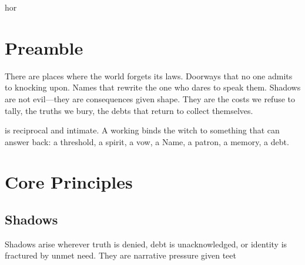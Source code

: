 hor{}




\section{Preamble}
There are places where the world forgets its laws.
Doorways that no one admits to knocking upon.
Names that rewrite the one who dares to speak them.
Shadows are not evil---they are consequences given shape. They are the costs we refuse to tally, the truths we bury, the debts that return to collect themselves.

\begin{RuleBox}
 is reciprocal and intimate. A working binds the witch to something that can answer back: a threshold, a spirit, a vow, a Name, a patron, a memory, a debt.
\end{RuleBox}

\section{Core Principles}
\subsection{Shadows}
Shadows arise wherever truth is denied, debt is unacknowledged, or identity is fractured by unmet need. They are narrative pressure given teet\documentclass[11pt,letterpaper]{article}
\usepackage[margin=0.85in]{geometry}
\usepackage{parskip}
\usepackage{enumitem}
\usepackage{booktabs}
\usepackage{tabularx}
\usepackage{xcolor}

\usepackage[utf8]{inputenc}
\usepackage[T1]{fontenc}
\usepackage{lmodern}
\usepackage[margin=1in]{geometry}
\usepackage{titlesec}
\usepackage{enumitem}
\usepackage[dvipsnames]{xcolor}
\usepackage[most]{tcolorbox}
\usepackage{fancyhdr}

\pagestyle{fancy}
\fancyhf{}
\renewcommand{\headrulewidth}{0pt}
\rfoot{\thepage}

\titleformat{\section}
  {\normalfont\Large\bfseries\scshape}{\thesection}{1em}{}
\titleformat{\subsection}
  {\normalfont\large\bfseries}{\thesubsection}{1em}{}
\titleformat{\subsubsection}
  {\normalfont\normalsize\bfseries\itshape}{\thesubsubsection}{1em}{}

